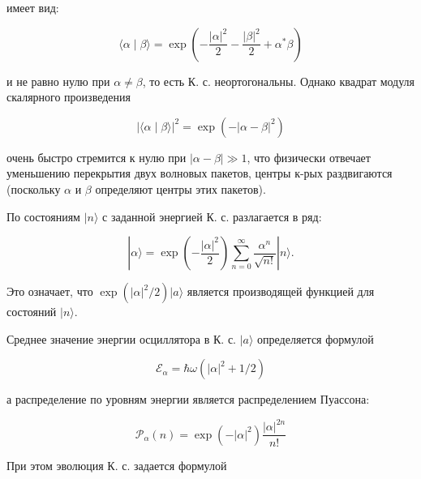\documentclass[10pt]{article}
\begin{document}
имеет вид:



\[

\langle\alpha \mid \beta\rangle=\exp \left(-\frac{|\alpha|^{2}}{2}-\frac{|\beta|^{2}}{2}+\alpha^{*} \beta\right)

\]



и не равно нулю при $\alpha \neq \beta$, то есть К. с. неортогональны. Однако квадрат модуля скалярного произведения



\[

|\langle\alpha \mid \beta\rangle|^{2}=\exp \left(-|\alpha-\beta|^{2}\right)

\]



очень быстро стремится к нулю при $|\alpha-\beta| \gg 1$, что физически отвечает уменьшению перекрытия двух волновых пакетов, центры к-рых раздвигаются (поскольку $\alpha$ и $\beta$ определяют центры этих пакетов).



По состояниям $|n\rangle$ с заданной энергией К. с. разлагается в ряд:



\[

|\alpha\rangle=\exp \left(-\frac{|\alpha|^{2}}{2}\right) \sum_{n=0}^{\infty} \frac{\alpha^{n}}{\sqrt{n !}}|n\rangle .

\]



Это означает, что $\exp \left(|\alpha|^{2} / 2\right)|a\rangle$ является производящей функцией для состояний $|n\rangle$.



Среднее значение энергии осциллятора в К. с. $|a\rangle$ определяется формулой



\[

\mathscr{E}_{\alpha}=\hbar \omega\left(|\alpha|^{2}+1 / 2\right)

\]



а распределение по уровням энергии является распределением Пуассона:



\[

\mathscr{P}_{\alpha}(n)=\exp \left(-|\alpha|^{2}\right) \frac{|\alpha|^{2 n}}{n !}

\]



При этом эволюция К. с. задается формулой
\end{document}

